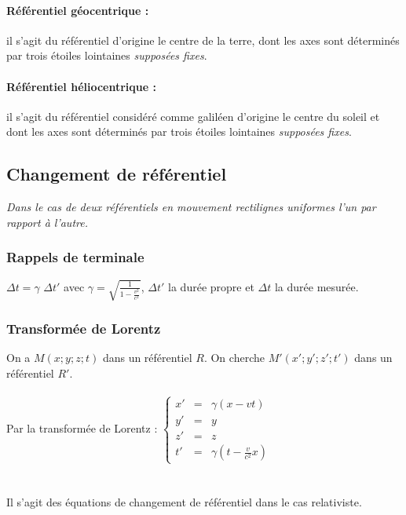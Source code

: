 \documentclass[a4paper,10pt]{book}
\begin{document}
\paragraph{Référentiel géocentrique :} il s'agit du référentiel d'origine le centre de la terre, dont les axes sont déterminés par trois étoiles lointaines \textit{supposées fixes}.

\paragraph{Référentiel héliocentrique :} il s'agit du référentiel considéré comme galiléen d'origine le centre du soleil et dont les axes sont déterminés par trois étoiles lointaines \textit{supposées fixes}.

\newpage

\subsection{Changement de référentiel}

\emph{Dans le cas de deux référentiels en mouvement rectilignes uniformes l'un par rapport à l'autre.}

\subsubsection{Rappels de terminale}
$\Delta t=\gamma$ $\Delta t'$ avec $\gamma =\sqrt{\frac{1}{1-\frac{v^{2}}{c^{2}}}}$, $\Delta t'$ la durée propre et $\Delta t$ la durée mesurée.\\

\subsubsection{Transformée de Lorentz}
On a $M(x;y;z;t)$ dans un référentiel $R$. On cherche $M'(x';y';z';t')$ dans un référentiel $R'$.\\\\
Par la transformée de Lorentz : $\left \{ \begin{array}{rcl} x'&=& \gamma(x-vt)\\
y'&=&y\\
z'&=&z \\
t'&=& \gamma(t-\frac{v}{c^{2}}x) \end{array} \right .$\\\\\\
Il s'agit des équations de changement de référentiel dans le cas relativiste.
\end{document}

